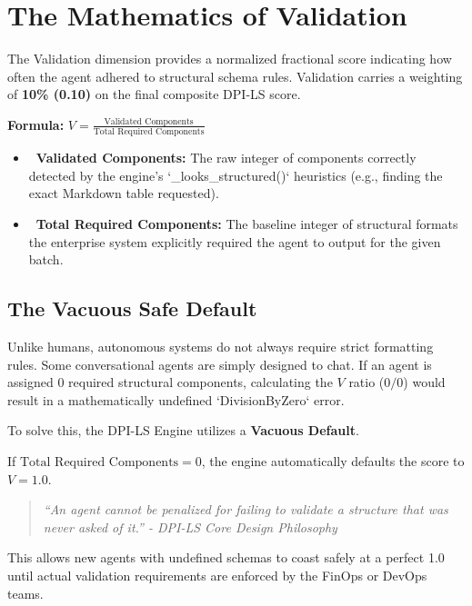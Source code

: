 \documentclass[11pt,a4paper]{article}
\begin{document}
\newpage

\section{The Mathematics of Validation}

The Validation dimension provides a normalized fractional score indicating how often the agent adhered to structural schema rules. Validation carries a weighting of \textbf{10\% (0.10)} on the final composite DPI-LS score.

\begin{dpiimportant}
\textbf{Formula:} $V = \frac{\text{Validated Components}}{\text{Total Required Components}}$
\end{dpiimportant}

\begin{itemize}
    \item \textbf{\color{dpiblue}\faCheckCircle\ Validated Components:} The raw integer of components correctly detected by the engine's `\_looks\_structured()` heuristics (e.g., finding the exact Markdown table requested).
    \item \textbf{\color{dpiteal}\faListUl\ Total Required Components:} The baseline integer of structural formats the enterprise system explicitly required the agent to output for the given batch.
\end{itemize}

\subsection{The Vacuous Safe Default}

Unlike humans, autonomous systems do not always require strict formatting rules. Some conversational agents are simply designed to chat. If an agent is assigned $0$ required structural components, calculating the $V$ ratio ($0 / 0$) would result in a mathematically undefined `DivisionByZero` error.

To solve this, the DPI-LS Engine utilizes a \textbf{Vacuous Default}. 

If $\text{Total Required Components} = 0$, the engine automatically defaults the score to $V = \mathbf{1.0}$. 
\begin{quote}
\textit{``An agent cannot be penalized for failing to validate a structure that was never asked of it.'' - DPI-LS Core Design Philosophy}
\end{quote}
This allows new agents with undefined schemas to coast safely at a perfect 1.0 until actual validation requirements are enforced by the FinOps or DevOps teams.
\end{document}
